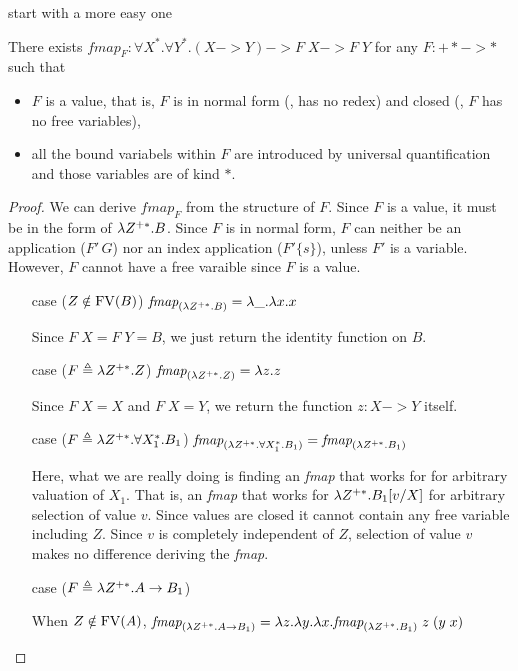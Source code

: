 start with a more easy one
\begin{proposition}\label{prop:fixi:fmapBaseCase}
There exists
$\textit{fmap}_F : \forall X^{*}.\forall Y^{*}.(X -> Y) -> F\;X -> F\;Y$
for any $F : +* -> *$ such that
\begin{itemize}
	\item $F$ is a value, that is, $F$ is
		in normal form (\ie, has no redex) and
		closed (\ie, $F$ has no free variables),
	\item all the bound variabels within $F$ are
		introduced by universal quantification
		and those variables are of kind $*$.
\end{itemize}
\end{proposition}
\begin{proof}
	We can derive $\textit{fmap}_F$ from the structure of $F$.
	Since $F$ is a value, it must be in the form of $\lambda Z^{+*}.B$.
	Since $F$ is in normal form, $F$ can neither be
	an application ($F'\,G$) nor an index application ($F'\{s\}$),
	unless $F'$ is a variable. However, $F$ cannot have a free varaible
	since $F$ is a value.
\begin{itemize}
\item[case]($Z\notin \mathop{\mathrm{FV}}(B)$)
	$ \textit{fmap}_{(\lambda Z^{+*}. B)} = \lambda \_ . \lambda x. x $

	Since $F\;X = F\;Y = B$, we just return the identity function on $B$.

\item[case]($F \triangleq \lambda Z^{+*}. Z$)
	$ \textit{fmap}_{(\lambda Z^{+*}. Z)} = \lambda z . z $

	Since $F\;X = X$ and $F\;X = Y$,
	we return the function $z:X -> Y$ itself.

\item[case]($F \triangleq \lambda Z^{+*}. \forall X_1^{*} .B_1$)
	$\textit{fmap}_{(\lambda Z^{+*}. \forall X_1^{*} .B_1)}
	= \textit{fmap}_{(\lambda Z^{+*}.B_1)}$

	Here, what we are really doing is finding an \textit{fmap}
	that works for for arbitrary valuation of $X_1$.
	That is, an \textit{fmap} that works for $\lambda Z^{+*}. B_1[v/X]$
	for arbitrary selection of value $v$. Since values are closed
	it cannot contain any free variable including $Z$. Since $v$
	is completely independent of $Z$, selection of value $v$ makes
	no difference deriving the \textit{fmap}.

\item[case]($F \triangleq \lambda Z^{+*}. A -> B_1$)

	When $Z\notin\mathop{\mathrm{FV}}(A)$,
	$\textit{fmap}_{(\lambda Z^{+*}.A -> B_1)}
	= \lambda z.\lambda y. \lambda x. \textit{fmap}_{(\lambda Z^{+*}.B_1)} \; z \; (y \; x)$


\end{itemize}
\end{proof}
